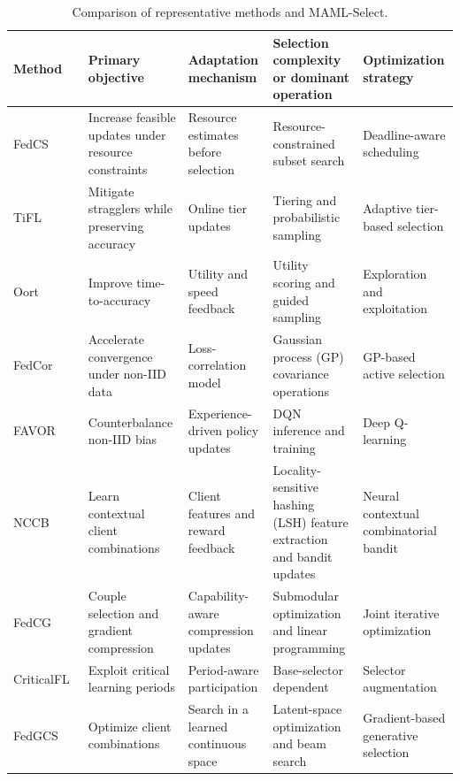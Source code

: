 \documentclass[journal]{IEEEtran}
\begin{document}
\begin{table}[!t]
    \color{blue}
    \caption{Comparison of representative methods and MAML-Select.}
    \label{tab:related_work_comparison}
    \centering
    \scriptsize
    \setlength{\tabcolsep}{3pt}
    \renewcommand{\arraystretch}{0.98}
    \begin{tabularx}{\textwidth}{lXXXX}
        \toprule
        \textbf{Method} & \textbf{Primary objective} & \textbf{Adaptation mechanism} & \textbf{Selection complexity or dominant operation} & \textbf{Optimization strategy} \\
        \midrule
        FedCS~\cite{nishio2019client} & Increase feasible updates under resource constraints & Resource estimates before selection & Resource-constrained subset search & Deadline-aware scheduling \\
        TiFL~\cite{chai2020tifl} & Mitigate stragglers while preserving accuracy & Online tier updates & Tiering and probabilistic sampling & Adaptive tier-based selection \\
        Oort~\cite{lai2021oort} & Improve time-to-accuracy & Utility and speed feedback & Utility scoring and guided sampling & Exploration and exploitation \\
        FedCor~\cite{tang2022fedcor} & Accelerate convergence under non-IID data & Loss-correlation model & Gaussian process (GP) covariance operations & GP-based active selection \\
        FAVOR~\cite{wang2020optimizing} & Counterbalance non-IID bias & Experience-driven policy updates & DQN inference and training & Deep Q-learning \\
        NCCB~\cite{pan2024contextual} & Learn contextual client combinations & Client features and reward feedback & Locality-sensitive hashing (LSH) feature extraction and bandit updates & Neural contextual combinatorial bandit \\
        FedCG~\cite{xu2024federated} & Couple selection and gradient compression & Capability-aware compression updates & Submodular optimization and linear programming & Joint iterative optimization \\
        CriticalFL~\cite{yan2023criticalfl} & Exploit critical learning periods & Period-aware participation & Base-selector dependent & Selector augmentation \\
        FedGCS~\cite{ning2024fedgcs} & Optimize client combinations & Search in a learned continuous space & Latent-space optimization and beam search & Gradient-based generative selection \\

\end{tabularx}
\end{table}
\end{document}
